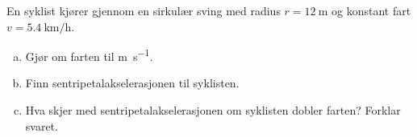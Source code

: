 %
En syklist kjører gjennom en sirkulær sving med radius $r = \SI{12}{\metre}$ og konstant fart $v = \SI{5.4}{\kilo\metre\per\hour}$.
\begin{enumerate}[a)]
    \item Gjør om farten til \si{\metre\per\second}.
    \item Finn sentripetalakselerasjonen til syklisten.
    \item Hva skjer med sentripetalakselerasjonen om syklisten dobler farten? Forklar svaret.
\end{enumerate}
